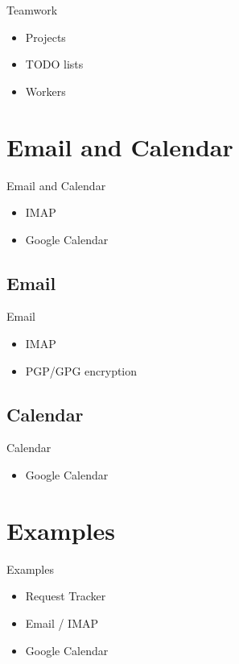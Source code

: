 \begin{frame}{Teamwork}
\begin{itemize}
\item Projects
\item TODO lists
\item Workers
\end{itemize}
\end{frame}

\section{Email and Calendar}

\begin{frame}{Email and Calendar}
\begin{itemize}
\item IMAP
\item Google Calendar
\end{itemize}
\end{frame}

\subsection{Email}
\begin{frame}{Email}
\begin{itemize}
\item IMAP
\item PGP/GPG encryption
\end{itemize}
\end{frame}

\subsection{Calendar}
\begin{frame}{Calendar}
\begin{itemize}
\item Google Calendar
\end{itemize}
\end{frame}

\section{Examples}

\begin{frame}{Examples}
\begin{itemize}
\item Request Tracker
\item Email / IMAP
\item Google Calendar
\end{itemize}
\end{frame}

